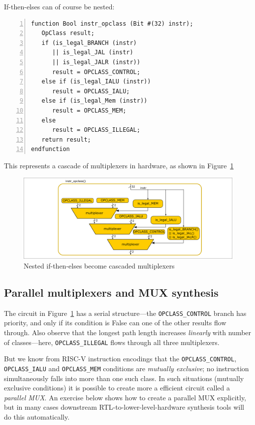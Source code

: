 If-then-elses can of course be nested:


\begin{Verbatim}[frame=single, numbers=left]
function Bool instr_opclass (Bit #(32) instr);
   OpClass result;
   if (is_legal_BRANCH (instr)
      || is_legal_JAL (instr)
      || is_legal_JALR (instr))
      result = OPCLASS_CONTROL;
   else if (is_legal_IALU (instr))
      result = OPCLASS_IALU;
   else if (is_legal_Mem (instr))
      result = OPCLASS_MEM;
   else
      result = OPCLASS_ILLEGAL;
   return result;
endfunction
\end{Verbatim}

This represents a cascade of multiplexers in hardware, as shown in
Figure~\ref{Fig_Combo_Multiplexer_Cascade}
\begin{figure}[htbp]
  \centerline{\includegraphics[width=6in,angle=0]{ch040_Combo_Circuits/Figures/Fig_Combo_Multiplexer_Cascade}}
  \caption{\label{Fig_Combo_Multiplexer_Cascade}Nested if-then-elses become cascaded multiplexers}
\end{figure}


\subsection{Parallel multiplexers and MUX synthesis}


The circuit in Figure~\ref{Fig_Combo_Multiplexer_Cascade} has a
serial structure---the \verb|OPCLASS_CONTROL| branch has priority, and
only if its condition is False can one of the other results flow
through.  Also observe that the longest path length increases
\emph{linearly} with number of classes---here, \verb|OPCLASS_ILLEGAL|
flows through all three multiplexers.

But we know from RISC-V instruction encodings that the
\verb|OPCLASS_CONTROL|, \verb|OPCLASS_IALU| and \verb|OPCLASS_MEM|
conditions are \emph{mutually exclusive}; no instruction
simultaneously falls into more than one such class.  In such
situations (mutually exclusive conditions) it is possible to create
more a efficient circuit called a \emph{parallel MUX}.  An exercise
below shows how to create a parallel MUX explicitly, but in many cases
downstream RTL-to-lower-level-hardware synthesis tools will do this
automatically.

